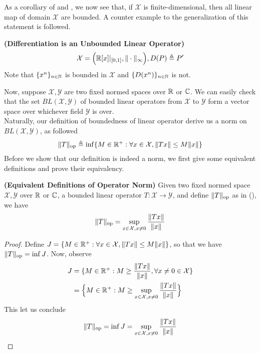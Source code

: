 \documentclass{report}
\begin{document}
\begin{mdframed}
As a corollary of  and , we now see that, if $\mathcal{X}$ is finite-dimensional, then all linear map of domain $\mathcal{X}$ are bounded. A counter example to the generalization of this statement is followed. 
\begin{Example}{\textbf{(Differentiation is an Unbounded Linear Operator)}}{}
\begin{align*}
\mathcal{X}=\Big(\mathbb{R}[x]|_{[0,1]}, \| \cdot \|_\infty \Big), D(P)\triangleq P'
\end{align*}
Note that $\{ x^n \}_{n\in\mathbb{N}}$ is bounded in $\mathcal{X}$ and $\{ D(x^n) \}_{n\in\mathbb{N}}$ is not.   
\end{Example}
Now, suppose $\mathcal{X},\mathcal{Y}$ are two fixed normed spaces over $\mathbb{R}$ or $\mathbb{C}$. We can easily check that the set $BL(\mathcal{X},\mathcal{Y})$ of bounded linear operators from $\mathcal{X}$ to $\mathcal{Y}$ form a vector space over whichever field $\mathcal{Y}$ is over.\\

Naturally, our definition of boundedness of linear operator derive us a norm on $BL(\mathcal{X},\mathcal{Y})$, as followed 
\begin{align}
\label{tnop}
\| T \|_{\text{op}}\triangleq \inf \{ M\in\mathbb{R}^+ :\forall x \in \mathcal{X}, \| Tx \|\leq M\| x \| \}
\end{align}
Before we show that our definition is indeed a norm, we first give some equivalent definitions and prove their equivalency. 
\end{mdframed}
\begin{theorem}
\textbf{(Equivalent Definitions of Operator Norm)} Given two fixed normed space $\mathcal{X},\mathcal{Y}$ over $\mathbb{R}$ or  $\mathbb{C}$, a bounded linear operator  $T:\mathcal{X}\rightarrow \mathcal{Y}$, and define $\| T \|_{\text{op}}$ as in (), we have 
\begin{align*}
\| T \|_{\text{op}}=\sup_{x\in \mathcal{X},x\neq 0} \frac{\| Tx \|}{\| x \|}
\end{align*}
\end{theorem}
\begin{proof}
Define $J=\{ M\in\mathbb{R}^+:\forall x \in \mathcal{X},\| Tx \|\leq M\| x \| \}$, so that we have $\| T \|_{\text{op}}=\inf J$. Now, observe 
\begin{align*}
J&=\{ M\in\mathbb{R}^+:M\geq \frac{\| Tx \|}{\| x \|},\forall x\neq 0\in \mathcal{X} \}\\
&=\Big\{ M\in\mathbb{R}^+ : M \geq \sup_{x \in \mathcal{X},x\neq 0} \frac{\| Tx \|}{\| x \|} \Big\}
\end{align*}
This let us conclude 
\begin{align*}
\| T \|_\text{op}=\inf J=\sup_{x \in \mathcal{X},x\neq 0} \frac{\| Tx \|}{\| x \|}
\end{align*}
\end{proof}
\end{document}
